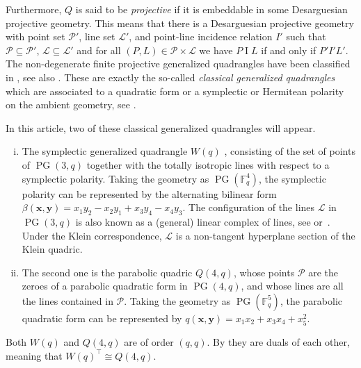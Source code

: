 \documentclass[a4paper,abstracton,12pt]{scrartcl}
\newcommand{\F}{\mathbb{F}}
\newcommand{\vek}[1]{\mathbf{#1}}
\DeclareMathOperator{\PG}{PG}
\theoremstyle{definition}
\theoremstyle{remark}
\begin{document}
Furthermore, $Q$ is said to be \emph{projective} if it is embeddable in some Desarguesian projective geometry.
This means that there is a Desarguesian projective geometry with point set $\mathcal{P}'$, line set $\mathcal{L}'$, and point-line incidence relation $I'$ such that $\mathcal{P}\subseteq\mathcal{P}'$, $\mathcal{L}\subseteq\mathcal{L'}$ and for all $(P,L)\in\mathcal{P}\times \mathcal{L}$ we have $P\mathrel{I} L$ if and only if $P' \mathrel{I'} L'$.
The non-degenerate finite projective generalized quadrangles have been classified in \cite[Th.~1]{Buekenhout-Lefevre-1974-ArchMath25[1]:540-552}, see also \cite[{{4.4.8.}}]{Payne-Thas-2009-FiniteGeneralizedQuadrangles2nd}.
These are exactly the so-called \emph{classical generalized quadrangles} which are associated to a quadratic form or a symplectic or Hermitean polarity on the ambient geometry, see \cite[{{3.1.1.}}]{Payne-Thas-2009-FiniteGeneralizedQuadrangles2nd}.

In this article, two of these classical generalized quadrangles will appear.
\begin{enumerate}[(i)]
\item The symplectic generalized quadrangle $W(q)$ \cite[3.1.1~(iii)]{Payne-Thas-2009-FiniteGeneralizedQuadrangles2nd}, consisting of the set of points of $\PG(3,q)$ together with the totally isotropic lines with respect to a symplectic polarity.
Taking the geometry as $\PG(\F_q^4)$, the symplectic polarity can be represented by the alternating bilinear form $\beta(\vek{x},\vek{y}) = x_1 y_2 - x_2 y_1 + x_3 y_4 - x_4 y_3$.
The configuration of the lines $\mathcal{L}$ in $\PG(3,q)$ is also known as a (general) linear complex of lines, see  \cite[3.1.1~(iii)]{Payne-Thas-2009-FiniteGeneralizedQuadrangles2nd} or~\cite[Th.~15.2.13]{Hirschfeld-1985-FiniteProjectiveSpacesOfThreeDimensions}.
Under the Klein correspondence, $\mathcal{L}$ is a non-tangent hyperplane section of the Klein quadric.
\item
The second one is the parabolic quadric $Q(4,q)$, whose points $\mathcal{P}$ are the zeroes of a parabolic quadratic form in $\PG(4,q)$, and whose lines are all the lines contained in $\mathcal{P}$.
Taking the geometry as $\PG(\F_q^5)$, the parabolic quadratic form can be represented by $q(\vek{x},\vek{y}) = x_1 x_2 + x_3 x_4 + x_5^2$.
\end{enumerate}
Both $W(q)$ and $Q(4,q)$ are of order $(q,q)$.
By \cite[{{3.2.1}}]{Payne-Thas-2009-FiniteGeneralizedQuadrangles2nd} they are duals of each other, meaning that $W(q)^\top \cong Q(4,q)$. 
\end{document}
